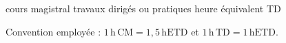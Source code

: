 
\vspace{.45\baselineskip}
\begin{center}
  \small
  \enspace cours magistral
  \qquad
  \enspace travaux dirigés ou pratiques
  \qquad
  \enspace heure équivalent TD
\end{center}

\begin{center}
  \footnotesize\color{EnsDark}
  Convention employée :
  \(1\,\mathrm{h\,CM}=1{,}5\,\mathrm{hETD}\) et
  \(1\,\mathrm{h\,TD}=1\,\mathrm{hETD}\).
\end{center}

